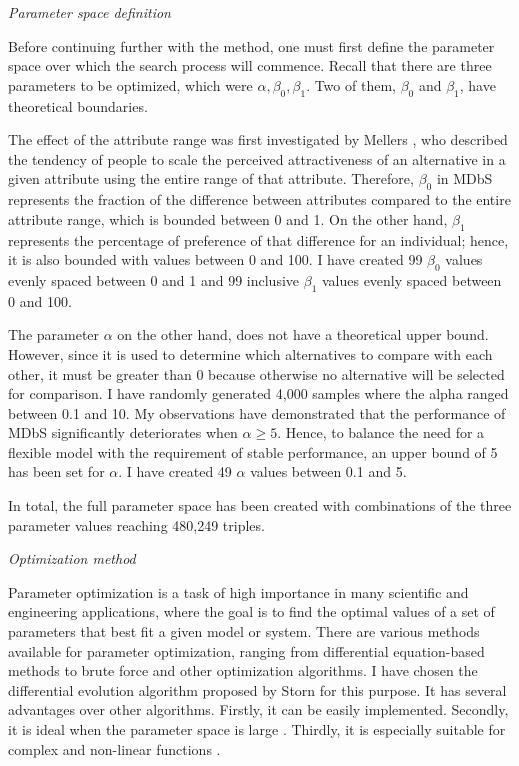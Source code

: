 \documentclass[a4paper,12pt]{article}
\newcommand{\citeyearonly}[1]{\citeyearpar{#1}}
\begin{document}
\textit{Parameter space definition}

Before continuing further with the method, one must first define the parameter space over which the search process will commence. Recall that there are three parameters to be optimized, which were $\alpha, \beta_0, \beta_1$. Two of them, $\beta_0$ and $\beta_1$, have theoretical boundaries. 

The effect of the attribute range was first investigated by Mellers \citeyearonly{mellers1994trade}, who described the tendency of people to scale the perceived attractiveness of an alternative in a given attribute using the entire range of that attribute. Therefore, $\beta_0$ in MDbS represents the fraction of the difference between attributes compared to the entire attribute range, which is bounded between 0 and 1. On the other hand, $\beta_1$ represents the percentage of preference of that difference for an individual; hence, it is also bounded with values between 0 and 100. I have created 99 $\beta_0$ values evenly spaced between 0 and 1 and 99 inclusive $\beta_1$ values evenly spaced between 0 and 100.

The parameter $\alpha$ on the other hand, does not have a theoretical upper bound. However, since it is used to determine which alternatives to compare with each other, it must be greater than 0 because otherwise no alternative will be selected for comparison. I have randomly generated 4,000 samples where the alpha ranged between 0.1 and 10. My observations have demonstrated that the performance of MDbS significantly deteriorates when $\alpha \ge 5$. Hence, to balance the need for a flexible model with the requirement of stable performance, an upper bound of 5 has been set for $\alpha$. I have created 49 $\alpha$ values between 0.1 and 5.

In total, the full parameter space has been created with combinations of the three parameter values reaching 480,249 triples.

\textit{Optimization method}

Parameter optimization is a task of high importance in many scientific and engineering applications, where the goal is to find the optimal values of a set of parameters that best fit a given model or system. There are various methods available for parameter optimization, ranging from differential equation-based methods to brute force and other optimization algorithms. I have chosen the differential evolution algorithm proposed by Storn \citeyearonly{storn1997differential} for this purpose. It has several advantages over other algorithms. Firstly, it can be easily implemented. Secondly, it is ideal when the parameter space is large \citep{lin2019applying}. Thirdly, it is especially suitable for complex and non-linear functions \citep{omran2009bare}. 
\end{document}

